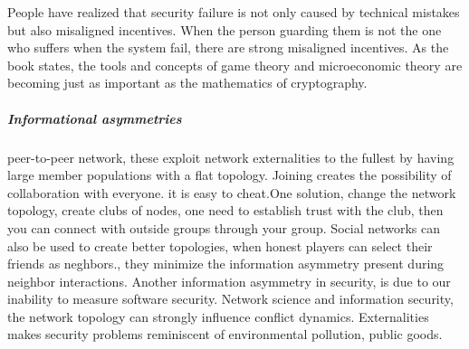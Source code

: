 People have realized that security failure is not only caused by technical mistakes but also misaligned incentives. When the person guarding them is not the one who suffers when the system fail, there are strong misaligned incentives. As the book \cite{anderson2010security} states, the tools and concepts of game theory and microeconomic theory are becoming just as important as the mathematics of cryptography.
\subparagraph{Informational asymmetries}
peer-to-peer network, these exploit network externalities to the fullest by having large member populations with a flat topology. Joining creates the possibility of collaboration with everyone. 
it is easy to cheat.One solution, change the network topology, create clubs of nodes, 
one need to establish trust with the club, then you can connect with outside groups through
 your group. Social networks can also be used to create better topologies, when honest players 
 can select their friends as neghbors., they minimize the information asymmetry present during
  neighbor interactions. 
Another information asymmetry in security, is due to our inability to measure software security. 
Network science and information security, the network topology can strongly influence conflict dynamics.
Externalities makes security problems reminiscent of environmental pollution, public goods. 


   
    
   
   
   
   
   
   
   
   
   
   
   
   
  

